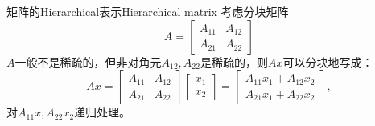 \begin{theorem}
    {矩阵的Hierarchical表示}{Hierarchical matrix}
    考虑分块矩阵
    \[
        A=\begin{bmatrix}
            A_{11}&A_{12}\\
            A_{21}&A_{22}
        \end{bmatrix}
    \]
    $A$一般不是稀疏的，但非对角元$A_{12},A_{22}$是稀疏的，则$Ax$可以分块地写成：
    \[
        Ax=\begin{bmatrix}
            A_{11}&A_{12}\\
            A_{21}&A_{22}
        \end{bmatrix}\begin{bmatrix}
            x_1\\x_2
        \end{bmatrix}=\begin{bmatrix}
            A_{11}x_1+A_{12}x_2\\
            A_{21}x_1+A_{22}x_2
        \end{bmatrix},
    \]
    对$A_{11}x,A_{22}x_2$递归处理。
    \begin{notecaptionblock}
        \label{fig:Hierarchical}
    \end{notecaptionblock}
\end{theorem}

